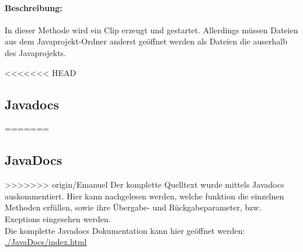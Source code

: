 \paragraph{Beschreibung:} In dieser Methode wird ein Clip erzeugt und gestartet. Allerdings müssen 
Dateien aus dem Javaprojekt-Ordner anderst geöffnet werden als Dateien die auserhalb des 
Javaprojekts.

<<<<<<< HEAD
\newpage



\subsection{Javadocs}
=======


\subsection{JavaDocs}
>>>>>>> origin/Emanuel
Der komplette Quelltext wurde mittels Javadocs auskommentiert. Hier kann nachgelesen werden, welche 
funktion die einzelnen Methoden erfüllen, sowie ihre Übergabe- und Rückgabeparameter, bzw. 
Exeptions  eingesehen werden.\\
Die komplette Javadocs Dokumentation kann hier geöffnet werden:\\
\url{./JavaDocs/index.html}



